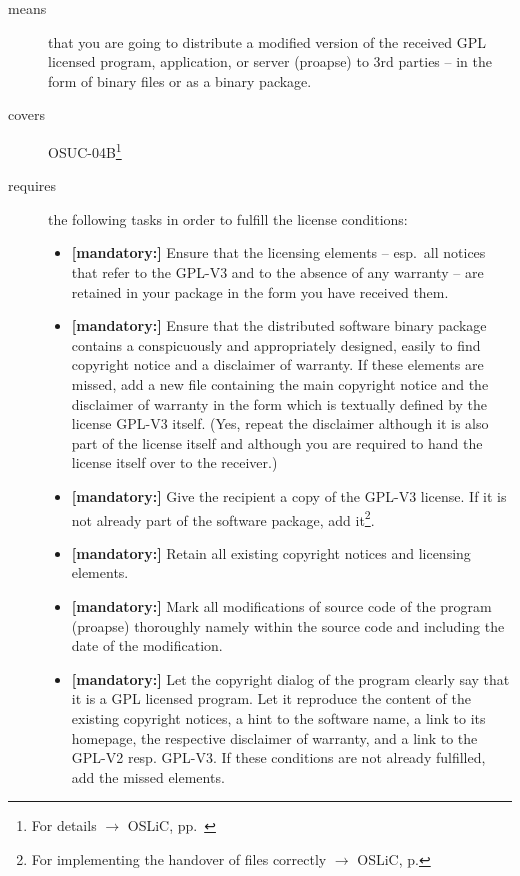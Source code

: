 \begin{description}
\item[means] that you are going to distribute a modified version of the received
GPL licensed pro\-gram, application, or server (proapse) to 3rd parties -- in
the form of binary files or as a binary package.
\item[covers] OSUC-04B\footnote{For details $\rightarrow$ OSLiC, pp.\
\pageref{OSUC-04B-DEF}}

\item[requires] the following tasks in order to fulfill the license conditions:
\begin{itemize}

  \item \textbf{[mandatory:]} Ensure that the licensing elements -- esp.\ all
  notices that refer to the GPL-V3 and to the absence of any
  warranty -- are retained in your package in the form you have received them.

  \item \textbf{[mandatory:]} Ensure that the distributed software binary
  package contains a conspicuously and appropriately designed, easily to find
  copyright notice and a disclaimer of warranty. If these elements are missed,
  add a new file containing the main copyright notice and the disclaimer of
  warranty in the form which is textually defined by the license GPL-V3 itself.
  (Yes, repeat the disclaimer although it is also part of the license itself and
  although you are required to hand the license itself over to the receiver.)
  
  \item \textbf{[mandatory:]} Give the recipient a copy of the GPL-V3 license.
  If it is not already part of the software package, add it\footnote{For
  implementing the handover of files correctly $\rightarrow$ OSLiC, p.
  \pageref{DistributingFilesHint}}.
  
  \item \textbf{[mandatory:]} Retain all existing copyright notices and
  licensing elements.
  
  \item \textbf{[mandatory:]} Mark all modifications of source code of the
  program (proapse) thoroughly namely within the source code and including
  the date of the modification.

  \item \textbf{[mandatory:]} Let the copyright dialog of the program clearly
  say that it is a GPL licensed program. Let it reproduce the content of the
  existing copyright notices, a hint to the software name, a link to its
  homepage, the respective disclaimer of warranty, and a link to the GPL-V2
  resp. GPL-V3. If these conditions are not already fulfilled, add the missed
  elements.
  

\end{itemize}
\end{description}
